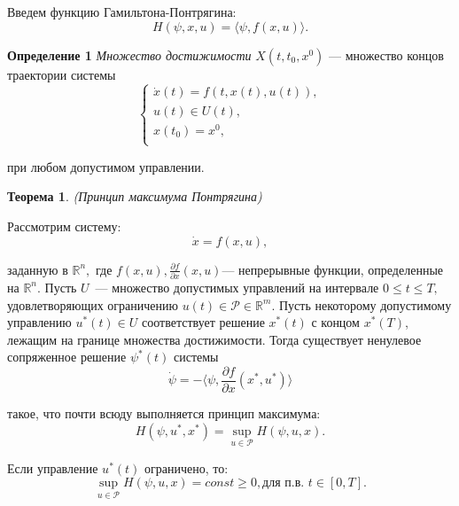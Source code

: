 \documentclass{article}
\theoremstyle{definition}
\begin{document}
	{Введем функцию Гамильтона-Понтрягина: }
	\begin{equation}
	H(\psi, x, u) = \langle \psi, f(x,u) \rangle.
	\end{equation}
	{\textbf{Определение 1} \textit{Множество достижимости} $X(t,t_0,x^0)$ --- множество концов траектории системы
	\begin{equation}
		\begin{cases}
		\dot x(t) = f(t,x(t),u(t)),\\
		u(t) \in U(t),\\
		x(t_0) = x^0,\\
		\end{cases}
	\end{equation}
	
	при любом допустимом управлении.}

 	\newtheorem{theorem}{Теорема}
 	\begin{theorem}
 		\textit{(Принцип максимума Понтрягина)}

		Рассмотрим систему:
 		\begin{equation}
 		\dot x = f(x,u),
 		\end{equation}
 		
 		{заданную в $\mathbb{R}^n,$ где $f(x,u), \frac{\partial f}{\partial x}(x,u)$--- непрерывные функции, определенные на $\mathbb{R}^{n}.$ Пусть $U$~--- множество допустимых управлений на интервале $0 \leq t \leq T,$ удовлетворяющих ограничению $u(t) \in \mathcal{P} \in \mathbb{R}^m$. Пусть некоторому допустимому управлению $u^*(t) \in U$ соответствует решение $x^*(t)$ с концом $x^*(T)$, лежащим на границе множества достижимости. Тогда существует ненулевое сопряженное решение $\psi^*(t)$ системы}
 		\begin{equation}
 		 \dot \psi = - \langle \psi, \frac{\partial f}{\partial x}(x^*,u^*) \rangle
 		\end{equation}
 		
 		{такое, что почти всюду выполняется принцип максимума:}
 		\begin{equation}
 			H(\psi, u^*, x^*) = \sup \limits_{u \in \mathcal{P}} H(\psi, u, x).
 		\end{equation}
 		
 		{Если управление $u^*(t)$ ограничено, то:}
 		\begin{equation}
 			\sup \limits_{u \in \mathcal{P}}H(\psi, u, x) = const \geq 0, \text{для п.в. } t \in [0, T].
 		\end{equation}
	\end{theorem}
 		
\end{document}
